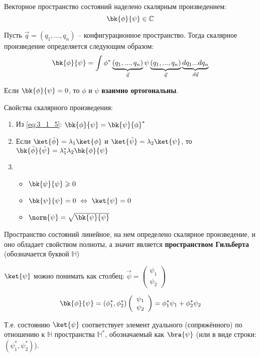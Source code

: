 Векторное пространство состояний наделено скалярным произведением:
$$
\bk{\phi}{\psi} \in \mathbb{C}
$$

\begin{defn}
Пусть $\vec{q} = (q_1, ..., q_n)$ -- конфигурационное пространство. Тогда скалярное произведение определяется следующим образом:
\begin{equation}
\label{eq:3_1_5}
\bk{\phi}{\psi} = \int \phi^*\underbrace{(q_1, ..., q_n)}_{\vec{q}} \psi\underbrace{(q_1, ..., q_n)}_{\vec{q}} \underbrace{d q_1 ... d q_n}_{d\vec{q}}
\end{equation}
\end{defn}

Если $\bk{\phi}{\psi} = 0$, то $\phi$ и $\psi$ \textbf{взаимно ортогональны}.

Свойства скалярного произведения:
\begin{enumerate}
\item Из \eqref{eq:3_1_5}: $\bk{\phi}{\psi} = \bk{\psi}{\phi}^*$
\item Если $\ket{\tilde{\phi}} = \lambda_1\ket{\phi}$ и $\ket{\tilde{\psi}} = \lambda_2\ket{\psi}$, то $\bk{\tilde{\phi}}{\tilde{\psi}} = \lambda_1^* \lambda_2 \bk{\phi}{\psi}$
\item
	\begin{itemize}
		\item $\bk{\psi}{\psi} \geqslant 0$
		\item $\bk{\psi}{\psi} = 0 ~\Leftrightarrow~ \ket{\psi} = 0$
		\item $\norm{\psi} = \sqrt{\bk{\psi}{\psi}}$
	\end{itemize}
\end{enumerate}

Пространство состояний линейное, на нем определено скалярное произведение, и оно обладает свойством полноты, а значит является \textbf{пространством Гильберта} (обозначается буквой $\mathbb{H}$)

$\ket{\psi}$ можно понимать как столбец: $\vec{\psi} = \left(\begin{array}{c} \psi_1 \\ \psi_2 \end{array}\right)$

$$
\bk{\phi}{\psi} = (\phi_1^*, \phi_2^*) \left(\begin{array}{c} \psi_1 \\ \psi_2 \end{array}\right) = \phi_1^*\psi_1 + \phi_2^* \psi_2
$$

Т.е. состоянию $\ket{\psi}$ соответствует элемент дуального (сопряжённого) по отношению к $\mathbb{H}$ пространства $\mathbb{H}^*$, обозначаемый как $\bra{\psi}$ (или в виде строки: $(\psi_1^*, \psi_2^*)$).

